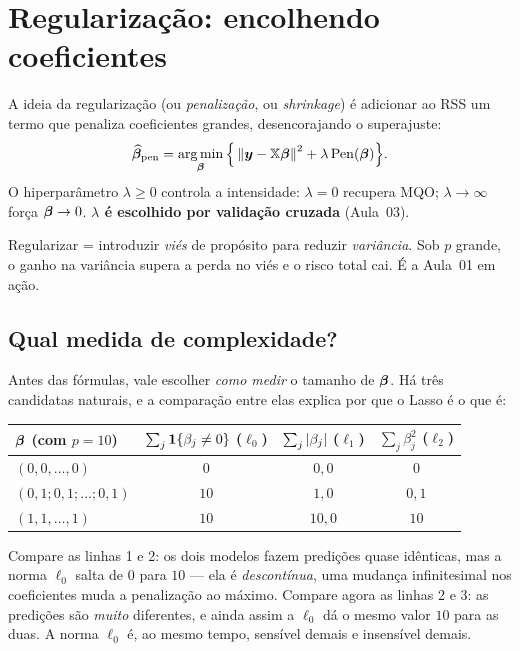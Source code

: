 \documentclass[11pt,a4paper]{article}
\begin{document}
\section{Regularização: encolhendo coeficientes}
A ideia da regularização (ou \emph{penalização}, ou \emph{shrinkage}) é adicionar
ao RSS um termo que penaliza coeficientes grandes, desencorajando o superajuste:
\[
  \widehat{\bbeta}_{\text{pen}}
  = \argmin_{\bbeta}\Big\{ \norm{\bm{y}-\mathbb{X}\bbeta}^2
       + \lambda\, \mathrm{Pen}(\bbeta) \Big\}.
\]
O hiperparâmetro $\lambda\ge 0$ controla a intensidade: $\lambda=0$ recupera MQO;
$\lambda\to\infty$ força $\bm{\beta}\to 0$. \textbf{$\lambda$ é escolhido por validação
cruzada} (Aula~03).

\begin{ideia}
Regularizar = introduzir \emph{viés} de propósito para reduzir \emph{variância}.
Sob $p$ grande, o ganho na variância supera a perda no viés e o risco total cai.
É a Aula~01 em ação.
\end{ideia}

\subsection{Qual medida de complexidade?}
Antes das fórmulas, vale escolher \emph{como medir} o tamanho de $\bm{\beta}$. Há três
candidatas naturais, e a comparação entre elas explica por que o Lasso é o que é:
\begin{center}\small
\renewcommand{\arraystretch}{1.25}
\begin{tabular}{@{}lccc@{}}
\toprule
$\bm{\beta}$ (com $p=10$) & $\sum_j\mathbf{1}\!\left\{\beta_j\neq0\right\}$ ($\ell_0$)
                      & $\sum_j\left\lvert \beta_j \right\rvert$ ($\ell_1$)
                      & $\sum_j\beta_j^2$ ($\ell_2$) \\
\midrule
$(0,0,\dots,0)$              & $0$  & $0{,}0$  & $0$  \\
$(0{,}1;0{,}1;\dots;0{,}1)$  & $10$ & $1{,}0$  & $0{,}1$ \\
$(1,1,\dots,1)$              & $10$ & $10{,}0$ & $10$ \\
\bottomrule
\end{tabular}
\end{center}
Compare as linhas 1 e 2: os dois modelos fazem predições quase idênticas, mas a
norma $\ell_0$ salta de $0$ para $10$ --- ela é \emph{descontínua}, uma mudança
infinitesimal nos coeficientes muda a penalização ao máximo. Compare agora as linhas
2 e 3: as predições são \emph{muito} diferentes, e ainda assim a $\ell_0$ dá o mesmo
valor $10$ para as duas. A norma $\ell_0$ é, ao mesmo tempo, sensível demais e
insensível demais.
\end{document}
